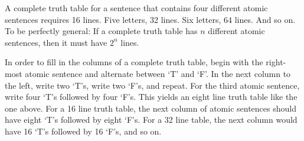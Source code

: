 A complete truth table for a sentence that contains four different atomic sentences requires 16 lines. Five letters, 32 lines. Six letters, 64 lines. And so on. To be perfectly general: If a complete truth table has $n$ different atomic sentences, then it must have $2^n$ lines.

In order to fill in the columns of a complete truth table, begin with the right-most atomic sentence and alternate between `T' and `F'. In the next column to the left, write two `T's, write two `F's, and repeat. For the third atomic sentence, write four `T's followed by four `F's. This yields an eight line truth table like the one above. For a 16 line truth table, the next column of atomic sentences should have eight `T's followed by eight `F's. For a 32 line table, the next column would have 16 `T's followed by 16 `F's, and so on.


